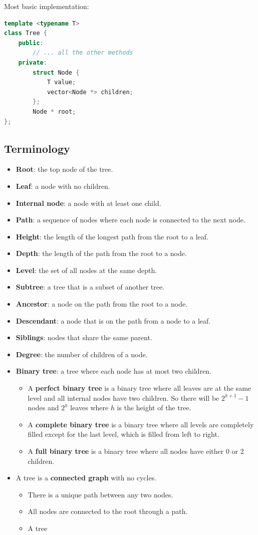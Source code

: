 \documentclass[letterpaper,12pt]{article}
\begin{document}
Most basic implementation: \begin{lstlisting}[language=C++]
template <typename T>
class Tree {
    public:
        // ... all the other methods
    private:
        struct Node {
            T value;
            vector<Node *> children;
        };
        Node * root;
};

\end{lstlisting}

\subsection{Terminology}
\begin{itemize}
    \item \textbf{Root}: the top node of the tree.
    \item \textbf{Leaf}: a node with no children.
    \item \textbf{Internal node}: a node with at least one child.
    \item \textbf{Path}: a sequence of nodes where each node is connected to the next node.
    \item \textbf{Height}: the length of the longest path from the root to a leaf.
    \item \textbf{Depth}: the length of the path from the root to a node.
    \item \textbf{Level}: the set of all nodes at the same depth.
    \item \textbf{Subtree}: a tree that is a subset of another tree.
    \item \textbf{Ancestor}: a node on the path from the root to a node.
    \item \textbf{Descendant}: a node that is on the path from a node to a leaf.
    \item \textbf{Siblings}: nodes that share the same parent.
    \item \textbf{Degree}: the number of children of a node.
    \item \textbf{Binary tree}: a tree where each node has at most two children.\begin{itemize}
        \item A \textbf{perfect binary tree} is a binary tree where all leaves are at the same level and all internal nodes have two children. So there will be $2^{h+1}-1$ nodes and $2^h$ leaves where $h$ is the height of the tree.
        \item A \textbf{complete binary tree} is a binary tree where all levels are completely filled except for the last level, which is filled from left to right. 
        \item A \textbf{full binary tree} is a binary tree where all nodes have either 0 or 2 children.
    \end{itemize}
    \item A tree is a \textbf{connected graph} with no cycles.\begin{itemize}
        \item There is a unique path between any two nodes.
        \item All nodes are connected to the root through a path.
        \item A tree
    \end{itemize}
\end{itemize}
\end{document}
